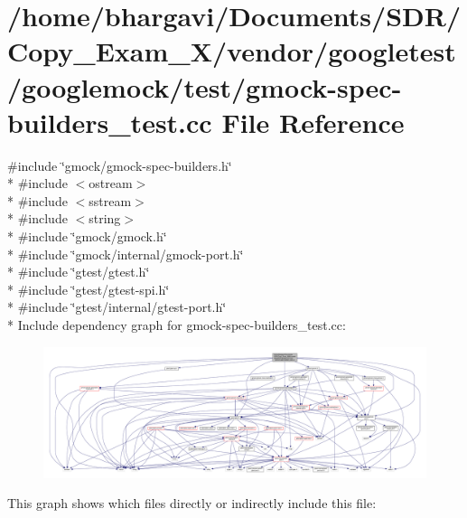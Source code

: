 \hypertarget{gmock-spec-builders__test_8cc}{}\section{/home/bhargavi/\+Documents/\+S\+D\+R/\+Copy\+\_\+\+Exam\+\_\+X/vendor/googletest/googlemock/test/gmock-\/spec-\/builders\+\_\+test.cc File Reference}
\label{gmock-spec-builders__test_8cc}
{\ttfamily \#include \char`\"{}gmock/gmock-\/spec-\/builders.\+h\char`\"{}}\\*
{\ttfamily \#include $<$ostream$>$}\\*
{\ttfamily \#include $<$sstream$>$}\\*
{\ttfamily \#include $<$string$>$}\\*
{\ttfamily \#include \char`\"{}gmock/gmock.\+h\char`\"{}}\\*
{\ttfamily \#include \char`\"{}gmock/internal/gmock-\/port.\+h\char`\"{}}\\*
{\ttfamily \#include \char`\"{}gtest/gtest.\+h\char`\"{}}\\*
{\ttfamily \#include \char`\"{}gtest/gtest-\/spi.\+h\char`\"{}}\\*
{\ttfamily \#include \char`\"{}gtest/internal/gtest-\/port.\+h\char`\"{}}\\*
Include dependency graph for gmock-\/spec-\/builders\+\_\+test.cc\+:
\nopagebreak
\begin{figure}[H]
\begin{center}
\leavevmode
\includegraphics[width=350pt]{gmock-spec-builders__test_8cc__incl}
\end{center}
\end{figure}
This graph shows which files directly or indirectly include this file\+:
\nopagebreak
